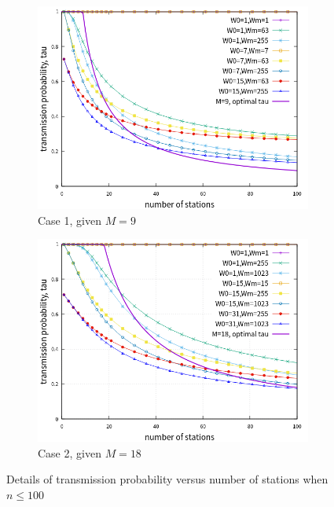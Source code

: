 \documentclass[journal]{IEEEtran}
\begin{document}
\begin{figure}[!h]
\centering
\begin{subfigure}{0.5\textwidth}
\centering
\includegraphics[scale=.54]{./figure/chp4/M9/n_tau_perf_M9_x100.png}
\caption{Case 1, given $M=9$}
\label{fig_tau_n_M9_detail}
\end{subfigure}

\begin{subfigure}{0.5\textwidth}
\centering
\includegraphics[scale=.54]{./figure/chp4/M18/n_tau_perf_M18_x100.png}
\caption{Case 2, given $M=18$}
\label{fig_tau_n_M18_detail}
\end{subfigure}

\caption{Details of transmission probability versus number of stations when $n\leq 100$}
\label{fig_tau_n_detail}
\end{figure}
\end{document}
